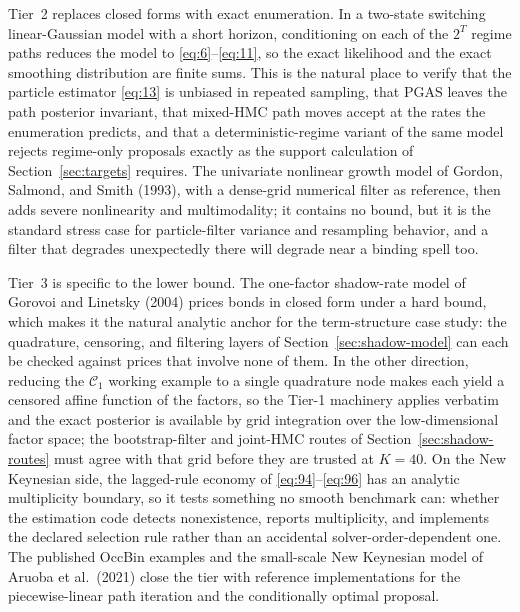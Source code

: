 \documentclass[11pt]{article}
\begin{document}
Tier~2 replaces closed forms with exact enumeration. In a two-state
switching linear-Gaussian model with a short horizon, conditioning on each
of the $2^{T}$ regime paths reduces the model to
\eqref{eq:6}--\eqref{eq:11}, so the exact likelihood and the exact smoothing
distribution are finite sums. This is the natural place to verify that the
particle estimator \eqref{eq:13} is unbiased in repeated sampling, that PGAS
leaves the path posterior invariant, that mixed-HMC path moves accept at the
rates the enumeration predicts, and that a deterministic-regime variant of
the same model rejects regime-only proposals exactly as the support
calculation of Section~\ref{sec:targets} requires. The univariate nonlinear
growth model of Gordon, Salmond, and Smith (1993), with a dense-grid
numerical filter as reference, then adds severe nonlinearity and
multimodality; it contains no bound, but it is the standard stress case for
particle-filter variance and resampling behavior, and a filter that degrades
unexpectedly there will degrade near a binding spell too.

Tier~3 is specific to the lower bound. The one-factor shadow-rate model of
Gorovoi and Linetsky (2004) prices bonds in closed form under a hard bound,
which makes it the natural analytic anchor for the term-structure case
study: the quadrature, censoring, and filtering layers of
Section~\ref{sec:shadow-model} can each be checked against prices that
involve none of them. In the other direction, reducing the $\mathcal C_1$
working example to a single quadrature node makes each yield a censored
affine function of the factors, so the Tier-1 machinery applies verbatim and
the exact posterior is available by grid integration over the low-dimensional
factor space; the bootstrap-filter and joint-HMC routes of
Section~\ref{sec:shadow-routes} must agree with that grid before they are
trusted at $K=40$. On the New Keynesian side, the lagged-rule economy of
\eqref{eq:94}--\eqref{eq:96} has an analytic multiplicity boundary, so it
tests something no smooth benchmark can: whether the estimation code
detects nonexistence, reports multiplicity, and implements the declared
selection rule rather than an accidental solver-order-dependent one. The
published OccBin examples and the small-scale New Keynesian model of Aruoba
et al.\ (2021) close the tier with reference implementations for the
piecewise-linear path iteration and the conditionally optimal proposal.
\end{document}
